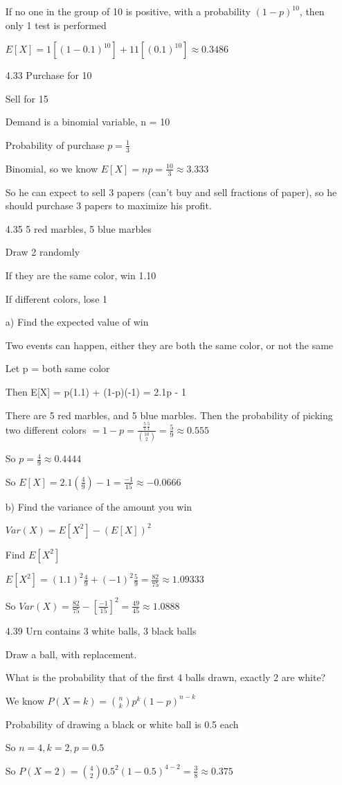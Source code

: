 \documentclass[11pt]{article}
\begin{document}
\begin{itemize}
  If no one in the group of 10 is positive, with a probability $(1-p)^{10}$, then only 1 test is performed

  $E[X] = 1[(1-0.1)^{10}] + 11[(0.1)^{10}] \approx 0.3486$
\item[4.33]
  Purchase for 10

  Sell for 15

  Demand is a binomial variable, n = 10

  Probability of purchase $p = \frac{1}{3}$

  Binomial, so we know $E[X] = np = \frac{10}{3} \approx 3.333$

  So he can expect to sell 3 papers (can't buy and sell fractions of paper), so he should purchase 3 papers to maximize his profit.
\item[4.35]
  5 red marbles, 5 blue marbles

  Draw 2 randomly

  If they are the same color, win 1.10

  If different colors, lose 1

  a) Find the expected value of win

  Two events can happen, either they are both the same color, or not the same

  Let p = both same color

  Then E[X] = p(1.1) + (1-p)(-1) = 2.1p - 1

  There are 5 red marbles, and 5 blue marbles. Then the probability of picking two different colors $ = 1 - p = \frac{\frac{5}{1}\frac{5}{1}}{\binom{10}{2}} = \frac{5}{9} \approx 0.555$

  So $p = \frac{4}{9} \approx 0.4444$

  So $E[X] = 2.1(\frac{4}{9}) - 1 = \frac{-1}{15} \approx -0.0666$

  b) Find the variance of the amount you win

  $Var(X) = E[X^2] - (E[X])^2$

  Find $E[X^2]$

  $E[X^2] = (1.1)^2 \frac{4}{9} + (-1)^2 \frac{5}{9} = \frac{82}{75} \approx 1.09333$

  So $Var(X) = \frac{82}{75} - [\frac{-1}{15}]^2 = \frac{49}{45} \approx 1.0888$
\item[4.39]
  Urn contains 3 white balls, 3 black balls

  Draw a ball, with replacement.

  What is the probability that of the first 4 balls drawn, exactly 2 are white?

  We know $P(X = k) = \binom{n}{k}p^k(1-p)^{n-k}$

  Probability of drawing a black or white ball is 0.5 each

  So $n = 4, k = 2, p = 0.5$

  So $P(X = 2) = \binom{4}{2} 0.5^2 (1-0.5)^{4-2} = \frac{3}{8} \approx 0.375$
\end{itemize}
\end{document}
